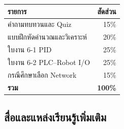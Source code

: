 \begin{table}[htbp]
    \centering
    \begin{tabular}{l r}
        \hline
        \textbf{รายการ} & \textbf{สัดส่วน} \\
        \hline
        คำถามทบทวนและ Quiz & 15\% \\
        แบบฝึกหัดคำนวณและวิเคราะห์ & 20\% \\
        ใบงาน 6-1 PID & 25\% \\
        ใบงาน 6-2 PLC–Robot I/O & 25\% \\
        กรณีศึกษาเลือก Network & 15\% \\
        \textbf{รวม} & \textbf{100\%} \\
        \hline
    \end{tabular}
\end{table}



\subsection{สื่อและแหล่งเรียนรู้เพิ่มเติม}

